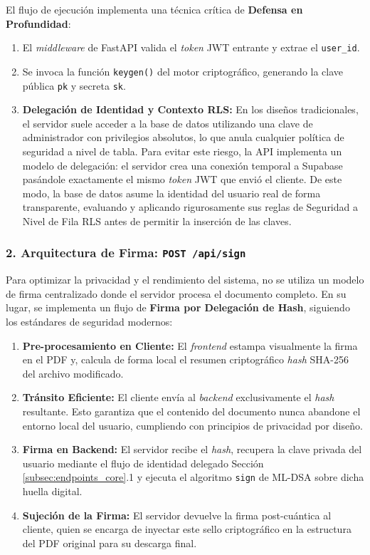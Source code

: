\documentclass[11pt, a4paper]{report}
\theoremstyle{definition}
\begin{document}
El flujo de ejecución implementa una técnica crítica de \textbf{Defensa en Profundidad}:
\begin{enumerate}
    \item El \textit{middleware} de FastAPI valida el \textit{token} JWT entrante y extrae el \texttt{user\_id}.
    \item Se invoca la función \texttt{keygen()} del motor criptográfico, generando la clave pública \texttt{pk} y secreta \texttt{sk}.
    \item \textbf{Delegación de Identidad y Contexto RLS:} En los diseños tradicionales, el servidor suele acceder a la base de datos utilizando una clave de administrador con privilegios absolutos, lo que anula cualquier política de seguridad a nivel de tabla. Para evitar este riesgo, la API implementa un modelo de delegación: el servidor crea una conexión temporal a Supabase pasándole exactamente el mismo \textit{token} JWT que envió el cliente. De este modo, la base de datos asume la identidad del usuario real de forma transparente, evaluando y aplicando rigurosamente sus reglas de Seguridad a Nivel de Fila RLS antes de permitir la inserción de las claves.
\end{enumerate}

\subsubsection{2. Arquitectura de Firma: \texttt{POST /api/sign}}

Para optimizar la privacidad y el rendimiento del sistema, no se utiliza un modelo de firma centralizado donde el servidor procesa el documento completo. En su lugar, se implementa un flujo de \textbf{Firma por Delegación de Hash}, siguiendo los estándares de seguridad modernos:

\begin{enumerate}
    \item \textbf{Pre-procesamiento en Cliente:} El \textit{frontend} estampa visualmente la firma en el PDF y, calcula de forma local el resumen criptográfico \textit{hash} SHA-256 del archivo modificado.
    \item \textbf{Tránsito Eficiente:} El cliente envía al \textit{backend} exclusivamente el \textit{hash} resultante. Esto garantiza que el contenido del documento nunca abandone el entorno local del usuario, cumpliendo con principios de privacidad por diseño.
    \item \textbf{Firma en Backend:} El servidor recibe el \textit{hash}, recupera la clave privada del usuario mediante el flujo de identidad delegado Sección \ref{subsec:endpoints_core}.1 y ejecuta el algoritmo \texttt{sign} de ML-DSA sobre dicha huella digital.
    \item \textbf{Sujeción de la Firma:} El servidor devuelve la firma post-cuántica al cliente, quien se encarga de inyectar este sello criptográfico en la estructura del PDF original para su descarga final.
\end{enumerate}
\end{document}
